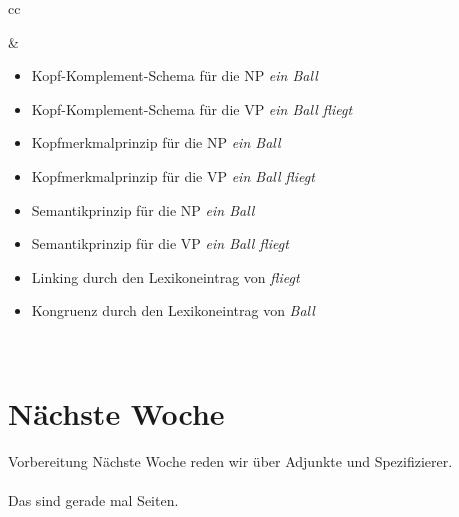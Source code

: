 \begin{frame}
\begin{tabular}[h]{cc}
\begin{minipage}{0.28\textwidth}
{
      }
    \end{minipage} & %
    \begin{minipage}{0.68\textwidth}
      \begin{itemize}[<+->]
        \item \alert<3>{Kopf-Komplement-Schema für die NP \textit{ein Ball}}
        \item \alert<4>{Kopf-Komplement-Schema für die VP \textit{ein Ball fliegt}}
        \item \alert<5>{Kopfmerkmalprinzip} für die NP \textit{ein Ball}
        \item \alert<6>{Kopfmerkmalprinzip} für die VP \textit{ein Ball fliegt}
        \item \alert<7>{Semantikprinzip} für die NP \textit{ein Ball}
        \item \alert<8>{Semantikprinzip} für die VP \textit{ein Ball fliegt}
          \Zeile
        \item \alert<9>{Linking durch den Lexikoneintrag von \textit{fliegt}}
        \item \alert<10>{Kongruenz durch den Lexikoneintrag von \textit{Ball}}
      \end{itemize}
    \end{minipage} \\
  \end{tabular}
  \onslide<+->
\end{frame}

\section{Nächste Woche}

\begin{frame}
  {Vorbereitung}
  \centering 
  \large
  Nächste Woche reden wir über Adjunkte und Spezifizierer.\\
  \Zeile
  \\
  \Viertelzeile
  Das sind gerade mal  Seiten.
\end{frame}
